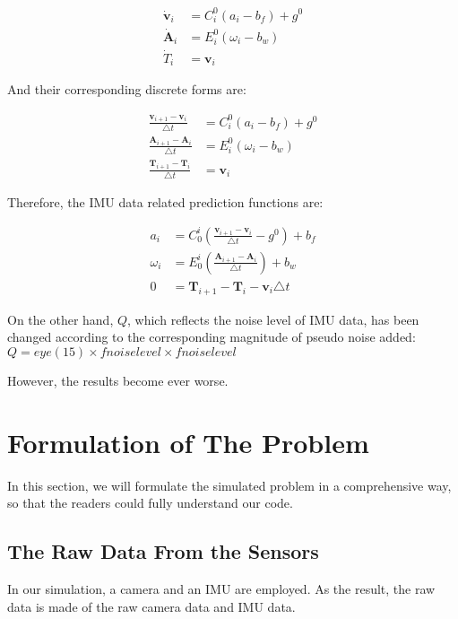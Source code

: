 \documentclass[12pt]{article}   %
\begin{document}
\begin{align*}
\dot{\textbf{v}}_i &= C_i^0 (a_i - b_f) + g^0 \\
\dot{\textbf{A}} _i &= E_i^0 (\omega _i - b_w) \\
\dot{T}_i &= \textbf{v}_i
\end{align*}

And their corresponding discrete forms are:

\begin{align*}
\frac {\textbf{v}_{i+1} - \textbf{v}_i} {\triangle t} &= C_i^0 (a_i - b_f) + g^0 \\
\frac {\textbf{A}_{i+1} - \textbf{A}_i} {\triangle t} &= E_i^0 (\omega _i - b_w) \\
\frac {\textbf{T}_{i+1}-\textbf{T}_i} {\triangle t} &= \textbf{v}_i
\end{align*}

Therefore, the IMU data related prediction functions are:

\begin{align*}
a_i &= C_0^i (\frac {\textbf{v}_{i+1} - \textbf{v}_i} {\triangle t} - g^0) + b_f \\
\omega_i &= E_0^i (\frac {\textbf{A}_{i+1} - \textbf{A}_i} {\triangle t}) + b_w \\
0 &= \textbf{T}_{i+1}-\textbf{T}_i - \textbf{v}_i {\triangle t}
\end{align*}

On the other hand, $Q$, which reflects the noise level of IMU data, has been changed according to the corresponding magnitude of pseudo noise added: $Q = eye(15) \times fnoiselevel \times fnoiselevel$

\noindent However, the results become ever worse.

\newpage
\section{Formulation of The Problem}

In this section, we will formulate the simulated problem in a comprehensive way, so that the readers could fully understand our code.

\subsection{The Raw Data From the Sensors}

In our simulation, a camera and an IMU are employed. As the result, the raw data is made of the raw camera data and IMU data.
\end{document}

